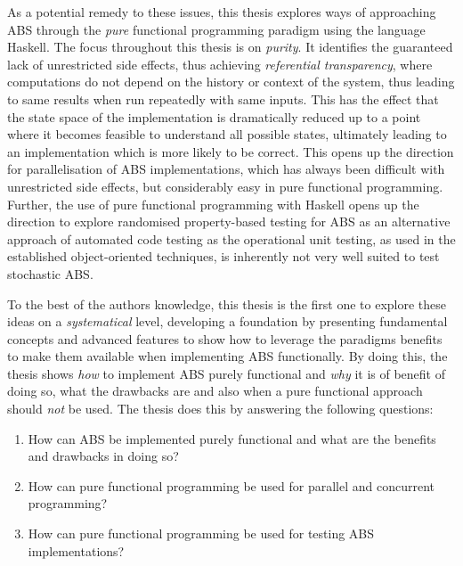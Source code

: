 As a potential remedy to these issues, this thesis explores ways of approaching ABS through the \textit{pure} functional programming paradigm using the language Haskell. The focus throughout this thesis is on \textit{purity}. It identifies the guaranteed lack of unrestricted side effects, thus achieving \textit{referential transparency}, where computations do not depend on the history or context of the system, thus leading to same results when run repeatedly with same inputs. This has the effect that the state space of the implementation is dramatically reduced up to a point where it becomes feasible to understand all possible states, ultimately leading to an implementation which is more likely to be correct. This opens up the direction for parallelisation of ABS implementations, which has always been difficult with unrestricted side effects, but considerably easy in pure functional programming. Further, the use of pure functional programming with Haskell opens up the direction to explore randomised property-based testing for ABS as an alternative approach of automated code testing as the operational unit testing, as used in the established object-oriented techniques, is inherently not very well suited to test stochastic ABS.

To the best of the authors knowledge, this thesis is the first one to explore these ideas on a \textit{systematical} level, developing a foundation by presenting fundamental concepts and advanced features to show how to leverage the paradigms benefits \cite{hudak_history_2007} to make them available when implementing ABS functionally. By doing this, the thesis shows \textit{how} to implement ABS purely functional and \textit{why} it is of benefit of doing so, what the drawbacks are and also when a pure functional approach should \textit{not} be used. The thesis does this by answering the following questions:

\begin{enumerate}
	\item How can ABS be implemented purely functional and what are the benefits and drawbacks in doing so?
	\item How can pure functional programming be used for parallel and concurrent programming? 
	\item How can pure functional programming be used for testing ABS implementations?
\end{enumerate}

\medskip

